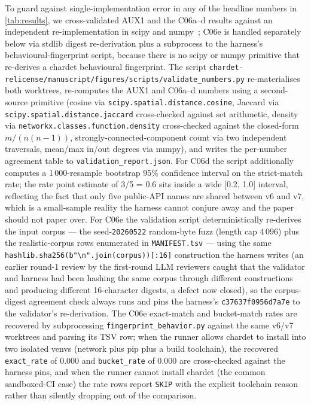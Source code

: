 \documentclass[11pt,letterpaper]{article}
\begin{document}
To guard against single-implementation error in any of the headline
numbers in \cref{tab:results}, we cross-validated AUX1 and the
C06a--d results against an independent re-implementation in scipy
and numpy~\cite{virtanen2020scipy,harris2020numpy}; C06e is handled
separately below via stdlib digest re-derivation plus a subprocess
to the harness's behavioural-fingerprint script, because there is
no scipy or numpy primitive that re-derives a chardet behavioural
fingerprint. The script
\texttt{chardet-relicense/manuscript/figures/scripts/validate\_numbers.py} re-materialises
both worktrees, re-computes the AUX1 and C06a--d numbers using a
second-source primitive (cosine via
\texttt{scipy.spatial.distance.cosine}, Jaccard via
\texttt{scipy.spatial.distance.jaccard} cross-checked against set
arithmetic, density via \texttt{networkx.classes.function.density}
cross-checked against the closed-form $m/(n(n-1))$,
strongly-connected-component count via two independent traversals,
mean/max in/out degrees via numpy), and writes the per-number
agreement table to \texttt{validation\_report.json}. For C06d the
script additionally computes a 1\,000-resample bootstrap 95\%
confidence interval on the strict-match rate; the rate point estimate
of 3/5 = 0.6 sits inside a wide [0.2, 1.0] interval, reflecting the
fact that only five public-API names are shared between v6 and v7,
which is a small-sample reality the harness cannot conjure away and
the paper should not paper over. For C06e the validation script
deterministically re-derives the input corpus --- the
seed-\texttt{20260522} random-byte fuzz (length cap 4\,096) plus the
realistic-corpus rows enumerated in \texttt{MANIFEST.tsv} --- using
the same
\texttt{hashlib.sha256(b"\textbackslash{}n".join(corpus))[:16]}
construction the harness writes (an earlier round-1 review by
the first-round LLM reviewers caught that the validator and harness
had been hashing the same corpus through different constructions and
producing different 16-character digests, a defect now closed),
so the corpus-digest agreement check always runs and pins the
harness's \texttt{c37637f0956d7a7e} to the validator's
re-derivation. The C06e exact-match and bucket-match rates are
recovered by subprocessing \texttt{fingerprint\_behavior.py} against
the same v6/v7 worktrees and parsing its TSV row; when the runner
allows chardet to install into two isolated venvs (network plus
pip plus a build toolchain), the recovered \texttt{exact\_rate}
of 0.000 and \texttt{bucket\_rate} of 0.000 are cross-checked
against the harness pins, and when the runner cannot install
chardet (the common sandboxed-CI case) the rate rows report
\texttt{SKIP} with the explicit toolchain reason rather than
silently dropping out of the comparison.
\end{document}
